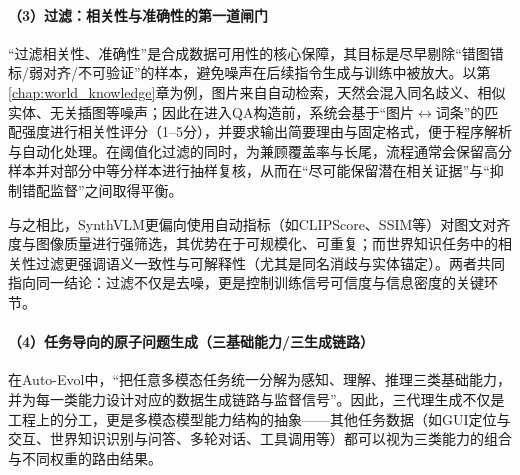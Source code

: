 \paragraph{（3）过滤：相关性与准确性的第一道闸门}
“过滤相关性、准确性”是合成数据可用性的核心保障，其目标是尽早剔除“错图错标/弱对齐/不可验证”的样本，避免噪声在后续指令生成与训练中被放大。以第\ref{chap:world_knowledge}章为例，图片来自自动检索，天然会混入同名歧义、相似实体、无关插图等噪声；因此在进入QA构造前，系统会基于“图片$\leftrightarrow$词条”的匹配强度进行相关性评分（1--5分），并要求输出简要理由与固定格式，便于程序解析与自动化处理。在阈值化过滤的同时，为兼顾覆盖率与长尾，流程通常会保留高分样本并对部分中等分样本进行抽样复核，从而在“尽可能保留潜在相关证据”与“抑制错配监督”之间取得平衡。

与之相比，SynthVLM更偏向使用自动指标（如CLIPScore、SSIM等）对图文对齐度与图像质量进行强筛选\citep{liu2025synthvlm,hessel2021clipscore,wang2004ssim}，其优势在于可规模化、可重复；而世界知识任务中的相关性过滤更强调语义一致性与可解释性（尤其是同名消歧与实体锚定）。两者共同指向同一结论：过滤不仅是去噪，更是控制训练信号可信度与信息密度的关键环节。

\paragraph{（4）任务导向的原子问题生成（三基础能力/三生成链路）}
在Auto-Evol中，“把任意多模态任务统一分解为感知、理解、推理三类基础能力，并为每一类能力设计对应的数据生成链路与监督信号”。因此，三代理生成不仅是工程上的分工，更是多模态模型能力结构的抽象——其他任务数据（如GUI定位与交互、世界知识识别与问答、多轮对话、工具调用等）都可以视为三类能力的组合与不同权重的路由结果。

